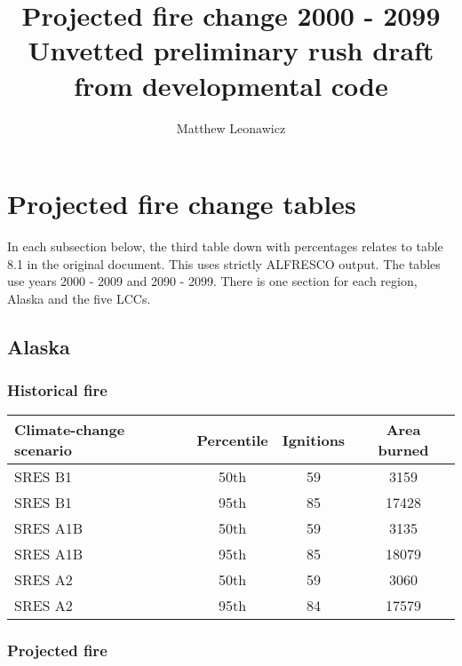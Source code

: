 \documentclass{article}\usepackage[]{graphicx}\usepackage[]{color}
\newcommand{\headcol}{\rowcolor{tableheadcolor}}
\begin{document}
\title{Projected fire change 2000 - 2099 \\ \large Unvetted preliminary rush draft from developmental code}
\author{Matthew Leonawicz}
\maketitle

\setlength{\aboverulesep}{0.2pt}
\setlength{\belowrulesep}{0.2pt}



\section{Projected fire change tables}
In each subsection below, the third table down with percentages relates to table 8.1 in the original document.
This uses strictly ALFRESCO output.
The tables use years 2000 - 2009 and 2090 - 2099.
There is one section for each region, Alaska and the five LCCs.


\subsection{Alaska}
\subsubsection{Historical fire}

\begin{table}[ht]
\centering
\begin{tabular}{lccc}
  \headcol 
 \toprule
Climate-change scenario & Percentile & Ignitions & Area burned \\ 
  \midrule
SRES B1 & 50th & 59 & 3159 \\ 
  SRES B1 & 95th & 85 & 17428 \\ 
  SRES A1B & 50th & 59 & 3135 \\ 
  SRES A1B & 95th & 85 & 18079 \\ 
  SRES A2 & 50th & 59 & 3060 \\ 
  SRES A2 & 95th & 84 & 17579 \\ 
   \bottomrule
\end{tabular}
\end{table}


\subsubsection{Projected fire}
\end{document}
